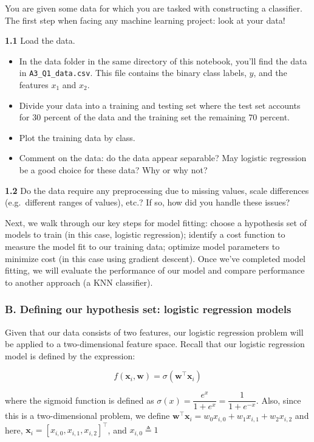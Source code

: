 \documentclass[
  letterpaper,
  DIV=11,
  numbers=noendperiod]{scrartcl}
\providecommand{\tightlist}{%
  \setlength{\itemsep}{0pt}\setlength{\parskip}{0pt}}\usepackage{longtable,booktabs,array}
\begin{document}
You are given some data for which you are tasked with constructing a
classifier. The first step when facing any machine learning project:
look at your data!

\textbf{1.1} Load the data.

\begin{itemize}
\tightlist
\item
  In the data folder in the same directory of this notebook, you'll find
  the data in \texttt{A3\_Q1\_data.csv}. This file contains the binary
  class labels, \(y\), and the features \(x_1\) and \(x_2\).
\item
  Divide your data into a training and testing set where the test set
  accounts for 30 percent of the data and the training set the remaining
  70 percent.\\
\item
  Plot the training data by class.
\item
  Comment on the data: do the data appear separable? May logistic
  regression be a good choice for these data? Why or why not?
\end{itemize}

\textbf{1.2} Do the data require any preprocessing due to missing
values, scale differences (e.g.~different ranges of values), etc.? If
so, how did you handle these issues?

Next, we walk through our key steps for model fitting: choose a
hypothesis set of models to train (in this case, logistic regression);
identify a cost function to measure the model fit to our training data;
optimize model parameters to minimize cost (in this case using gradient
descent). Once we've completed model fitting, we will evaluate the
performance of our model and compare performance to another approach (a
KNN classifier).

\subsubsection{B. Defining our hypothesis set: logistic regression
models}\label{b.-defining-our-hypothesis-set-logistic-regression-models}

Given that our data consists of two features, our logistic regression
problem will be applied to a two-dimensional feature space. Recall that
our logistic regression model is defined by the expression:

\[f(\mathbf{x}_i,\mathbf{w})=\sigma(\mathbf{w}^{\top} \mathbf{x}_i)\]

where the sigmoid function is defined as
\(\sigma(x) = \dfrac{e^x}{1+e^{x}}= \dfrac{1}{1+e^{-x}}\). Also, since
this is a two-dimensional problem, we define
\(\mathbf{w}^{\top} \mathbf{x}_i = w_0 x_{i,0} + w_1 x_{i,1} + w_2 x_{i,2}\)
and here, \(\mathbf{x}_i=[x_{i,0}, x_{i,1}, x_{i,2}]^{\top}\), and
\(x_{i,0} \triangleq 1\)
\end{document}
